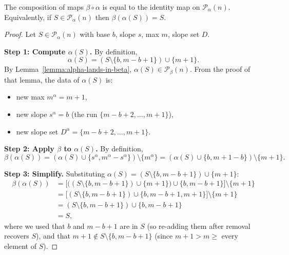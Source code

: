 \begin{lemma}\label{lemma:beta-after-alpha}\leanok
  The composition of maps $\beta\circ\alpha$ is equal to the identity map on  $\mathcal{P}_\alpha(n)$. Equivalently, if $S\in \mathcal{P}_\alpha(n)$ then $\beta(\alpha(S))=S$.
\end{lemma}
\begin{proof}\leanok
Let $S \in \mathcal{P}_\alpha(n)$ with base $b$, slope $s$, max $m$, slope set $D$.

\textbf{Step 1: Compute $\alpha(S)$.}
By definition,
$$\alpha(S) = (S \setminus \{b, m - b + 1\}) \cup \{m + 1\}.$$
By Lemma~\ref{lemma:alpha-lands-in-beta}, $\alpha(S) \in \mathcal{P}_\beta(n)$. From the proof of that lemma, the data of $\alpha(S)$ is:
\begin{itemize}
\item new max $m^\alpha = m + 1$,
\item new slope $s^\alpha = b$ (the run $\{m - b + 2, \ldots, m + 1\}$),
\item new slope set $D^\alpha = \{m - b + 2, \ldots, m + 1\}$.
\end{itemize}

\textbf{Step 2: Apply $\beta$ to $\alpha(S)$.}
By definition,
$$\beta(\alpha(S)) = (\alpha(S) \cup \{s^\alpha, m^\alpha - s^\alpha\}) \setminus \{m^\alpha\} = (\alpha(S) \cup \{b, m + 1 - b\}) \setminus \{m + 1\}.$$

\textbf{Step 3: Simplify.}
Substituting $\alpha(S) = (S \setminus \{b, m - b + 1\}) \cup \{m + 1\}$:
\begin{align*}
\beta(\alpha(S))
&= \bigl[\bigl((S \setminus \{b, m - b + 1\}) \cup \{m + 1\}\bigr) \cup \{b, m - b + 1\}\bigr] \setminus \{m + 1\} \\
&= \bigl[(S \setminus \{b, m - b + 1\}) \cup \{b, m - b + 1, m + 1\}\bigr] \setminus \{m + 1\} \\
&= (S \setminus \{b, m - b + 1\}) \cup \{b, m - b + 1\} \\
&= S,
\end{align*}
where we used that $b$ and $m - b + 1$ are in $S$ (so re-adding them after removal recovers $S$), and that $m + 1 \notin S \setminus \{b, m - b + 1\}$ (since $m + 1 > m \geq$ every element of $S$).
\end{proof}

